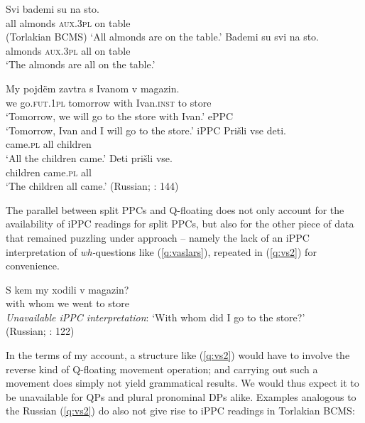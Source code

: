 \documentclass[output=paper,colorlinks,citecolor=brown]{langscibook}
\begin{document}
\ea \ea
\gll Svi bademi su na sto. \\
 all almonds \textsc{aux.3pl} on table \\
\hfill (Torlakian BCMS) \glt `All almonds are on the table.' \label{tor:nfloat}
\ex
\gll Bademi su svi na sto. \\
 almonds \textsc{aux.3pl} all on table \\
 \glt `The almonds are all on the table.' \label{tor:float}
\z \z

\ea \ea
\gll My pojdëm zavtra s Ivanom v magazin. \\
 we go.\textsc{fut.1pl} tomorrow with Ivan.\textsc{inst} to store \\
 \glt `Tomorrow, we will go to the store with Ivan.' \hfill ePPC\\
 `Tomorrow, Ivan and I will go to the store.' \hfill iPPC\label{ru:split}
\ex
\gll Prišli vse deti. \\
 came.\textsc{pl} all children \\
 \glt `All the children came.' \label{ru:nfloat}
\ex
\gll Deti prišli vse. \\
 children came.\textsc{pl} all \\
 \glt `The children all came.' \label{ru:float}
\hfill (Russian; \cite{Fitzpatrick2006}: 144)
\z \z 

\noindent The parallel between split PPCs and Q-floating does not only account for the availability of iPPC readings for split PPCs, but also for the other piece of data that remained puzzling under  approach -- namely the lack of an iPPC interpretation of \textit{wh-}questions like (\ref{q:vaslars}), repeated in (\ref{q:vs2}) for convenience.

\ea
\gll S kem my xodili v magazin? \\
 with whom we went to store \\
 \glt \textit{Unavailable iPPC interpretation}: `With whom did I go to the store?' \\
\hfill (Russian; \cite{VassilievaLarson2005}: 122) \label{q:vs2}
\z

\noindent In the terms of my account, a structure like (\ref{q:vs2}) would have to involve the reverse kind of Q-floating movement operation; and carrying out such a movement does simply not yield grammatical results. We would thus expect it to be unavailable for QPs and plural pronominal DPs alike. Examples analogous to the Russian (\ref{q:vs2}) do also not give rise to iPPC readings in Torlakian BCMS: 
\end{document}
